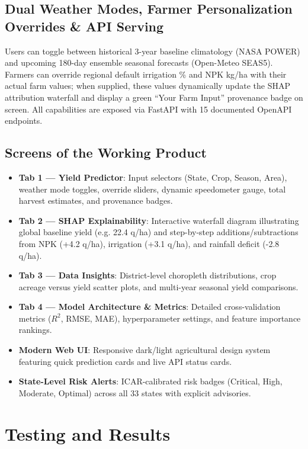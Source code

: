 \documentclass[11pt,a4paper]{report}
\begin{document}
\section{Dual Weather Modes, Farmer Personalization Overrides \& API Serving}
Users can toggle between historical 3-year baseline climatology (NASA POWER) and upcoming 180-day ensemble seasonal forecasts (Open-Meteo SEAS5). Farmers can override regional default irrigation \% and NPK kg/ha with their actual farm values; when supplied, these values dynamically update the SHAP attribution waterfall and display a green ``Your Farm Input'' provenance badge on screen. All capabilities are exposed via FastAPI with 15 documented OpenAPI endpoints.

\section{Screens of the Working Product}
\begin{itemize}
  \item \textbf{Tab 1 --- Yield Predictor}: Input selectors (State, Crop, Season, Area), weather mode toggles, override sliders, dynamic speedometer gauge, total harvest estimates, and provenance badges.
  \item \textbf{Tab 2 --- SHAP Explainability}: Interactive waterfall diagram illustrating global baseline yield (e.g. 22.4 q/ha) and step-by-step additions/subtractions from NPK (+4.2 q/ha), irrigation (+3.1 q/ha), and rainfall deficit (-2.8 q/ha).
  \item \textbf{Tab 3 --- Data Insights}: District-level choropleth distributions, crop acreage versus yield scatter plots, and multi-year seasonal yield comparisons.
  \item \textbf{Tab 4 --- Model Architecture \& Metrics}: Detailed cross-validation metrics ($R^2$, RMSE, MAE), hyperparameter settings, and feature importance rankings.
  \item \textbf{Modern Web UI}: Responsive dark/light agricultural design system featuring quick prediction cards and live API status cards.
  \item \textbf{State-Level Risk Alerts}: ICAR-calibrated risk badges (Critical, High, Moderate, Optimal) across all 33 states with explicit advisories.
\end{itemize}

\chapter{Testing and Results}
\end{document}
